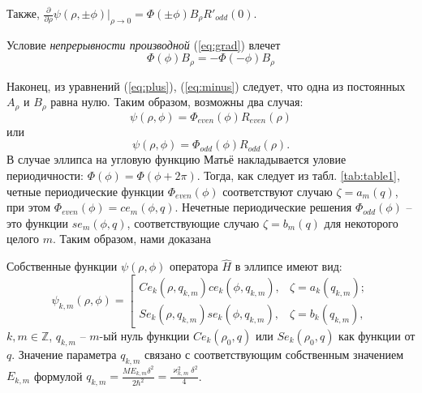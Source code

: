 Также, $\frac{\partial}{\partial \rho} \psi( \rho,\pm \phi)|_{\rho \to 0} = \Phi(\pm\phi) B_\rho R'_{odd}(0)$.

Условие \textit{непрерывности производной} (\ref{eq:grad}) влечет
\begin{equation}\label{eq:minus}
 \Phi(\phi) B_\rho = -\Phi(-\phi) B_\rho
\end{equation}

Наконец, из уравнений (\ref{eq:plus}), (\ref{eq:minus}) следует, что одна из постоянных $A_\rho$ и $B_\rho$ равна нулю.
Таким образом, возможны два случая:
\[ \psi(\rho,\phi) = \Phi_{even}(\phi) R_{even}(\rho)  \] 
или
\[ \psi(\rho,\phi) = \Phi_{odd}(\phi) R_{odd}(\rho) .  \]
В случае эллипса на угловую функцию Матьё накладывается уловие периодичности: $\Phi(\phi) = \Phi(\phi+ 2 \pi)$. 
Тогда, как следует из табл. \ref{tab:table1}, четные периодические функции $\Phi_{even}(\phi)$ соответствуют случаю $\zeta = a_m(q)$, при этом $\Phi_{even}(\phi) = ce_m(\phi, q)$. 
Нечетные периодические решения $\Phi_{odd}(\phi)$ -- это функции 
$se_m(\phi, q)$, соответствующие случаю $\zeta = b_m(q)$ для некоторого целого $m$. Таким образом, нами доказана
    
\begin{statement}
Собственные функции $\psi(\rho, \phi)$ оператора $\hat{H}$ в эллипсе имеют вид:
\[
    \psi_{k,m}(\rho, \phi) = \left[
    \begin{array}{ccc}
    Ce_k(\rho, q_{k,m})ce_k(\phi, q_{k,m}), & \zeta = a_k(q_{k, m}); \\
    Se_k(\rho, q_{k,m})se_k(\phi, q_{k,m}), & \zeta = b_k(q_{k, m}),
    \end{array}
    \right.
\]
$k, m \in \mathbb{Z}$, $q_{k, m}$ -- $m$-ый нуль функции $Ce_k(\rho_0, q)$ или $Se_k(\rho_0, q)$ как функции от $q$.
Значение параметра $q_{k,m}$ связано с соответствующим собственным значением $E_{k,m}$ формулой  $q_{k,m} = \frac{M E_{k,m}\delta^2}{2\hbar^2} = \frac{\varkappa_{k,m}^2\delta^2}{4}$. 
\end{statement}

